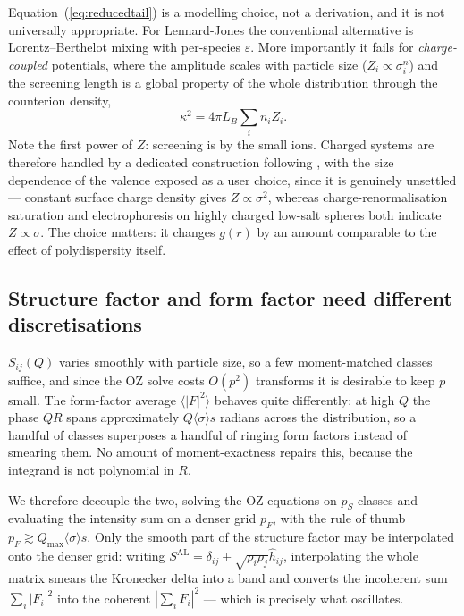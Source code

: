 \documentclass[11pt,a4paper]{article}
\newcommand{\Q}{Q}
\begin{document}
Equation~(\ref{eq:reducedtail}) is a modelling choice, not a derivation, and it
is not universally appropriate. For Lennard-Jones the conventional alternative
is Lorentz--Berthelot mixing with per-species $\varepsilon$. More importantly
it fails for \emph{charge-coupled} potentials, where the amplitude scales with
particle size ($Z_i \propto \sigma_i^n$) and the screening length is a global
property of the whole distribution through the counterion density,
\begin{equation}
\kappa^2 = 4\pi L_B \sum_i n_i Z_i .
\label{eq:kappa}
\end{equation}
Note the first power of $Z$: screening is by the small ions. Charged systems
are therefore handled by a dedicated construction following
\citet{DAguannoKlein1992},
with the size dependence of the valence exposed as a user choice, since it is
genuinely unsettled --- constant surface charge density gives $Z\propto\sigma^2$,
whereas charge-renormalisation saturation and electrophoresis on highly charged
low-salt spheres both indicate $Z\propto\sigma$. The choice matters: it changes
$g(r)$ by an amount comparable to the effect of polydispersity itself.

\subsection{Structure factor and form factor need different discretisations}
\label{sec:nff}

$S_{ij}(\Q)$ varies smoothly with particle size, so a few moment-matched
classes suffice, and since the OZ solve costs $O(p^2)$ transforms it is
desirable to keep $p$ small. The form-factor average $\langle|F|^2\rangle$
behaves quite differently: at high $\Q$ the phase $\Q R$ spans approximately
$\Q\langle\sigma\rangle s$ radians across the distribution, so a handful of
classes superposes a handful of ringing form factors instead of smearing them.
No amount of moment-exactness repairs this, because the integrand is not
polynomial in $R$.

We therefore decouple the two, solving the OZ equations on $p_S$ classes and
evaluating the intensity sum on a denser grid $p_F$, with the rule of thumb
$p_F \gtrsim \Q_{\max}\langle\sigma\rangle s$. Only the smooth part of the
structure factor may be interpolated onto the denser grid: writing
$S^{\mathrm{AL}} = \delta_{ij} + \sqrt{\rho_i\rho_j}\hat h_{ij}$, interpolating
the whole matrix smears the Kronecker delta into a band and converts the
incoherent sum $\sum_i|F_i|^2$ into the coherent $|\sum_i F_i|^2$ --- which is
precisely what oscillates.
\end{document}
